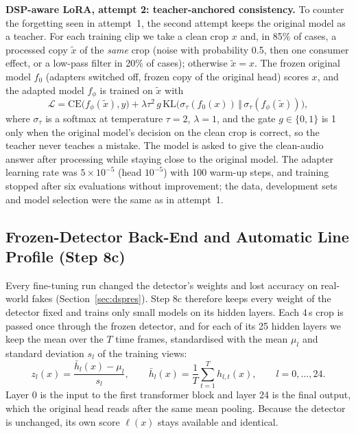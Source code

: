 \documentclass[10pt,a4paper,twocolumn]{article}
\newcommand{\llr}{\ell}
\begin{document}
\textbf{DSP-aware LoRA, attempt 2: teacher-anchored consistency.} To counter the forgetting seen in attempt~1, the second attempt keeps the original model as a teacher. For each training clip we take a clean crop $x$ and, in 85\% of cases, a processed copy $\tilde x$ of the \emph{same} crop (noise with probability 0.5, then one consumer effect, or a low-pass filter in 20\% of cases); otherwise $\tilde x=x$. The frozen original model $f_0$ (adapters switched off, frozen copy of the original head) scores $x$, and the adapted model $f_\phi$ is trained on $\tilde x$ with
\begin{equation}
\mathcal{L}=\mathrm{CE}\big(f_\phi(\tilde x),y\big)+\lambda\tau^{2}\,g\,\mathrm{KL}\big(\sigma_\tau(f_0(x))\,\Vert\,\sigma_\tau(f_\phi(\tilde x))\big),
\label{eq:consistency}
\end{equation}
where $\sigma_\tau$ is a softmax at temperature $\tau=2$, $\lambda=1$, and the gate $g\in\{0,1\}$ is 1 only when the original model's decision on the clean crop is correct, so the teacher never teaches a mistake. The model is asked to give the clean-audio answer after processing while staying close to the original model. The adapter learning rate was $5\times10^{-5}$ (head $10^{-5}$) with 100 warm-up steps, and training stopped after six evaluations without improvement; the data, development sets and model selection were the same as in attempt~1.

\subsection{Frozen-Detector Back-End and Automatic Line Profile (Step 8c)}
\label{sec:backend}
Every fine-tuning run changed the detector's weights and lost accuracy on real-world fakes (Section~\ref{sec:dspres}). Step 8c therefore keeps every weight of the detector fixed and trains only small models on its hidden layers. Each 4\,s crop is passed once through the frozen detector, and for each of its 25 hidden layers we keep the mean over the $T$ time frames, standardised with the mean $\mu_l$ and standard deviation $s_l$ of the training views:
\begin{equation}
z_l(x)=\frac{\bar h_l(x)-\mu_l}{s_l},\qquad \bar h_l(x)=\frac{1}{T}\sum_{t=1}^{T}h_{l,t}(x),\qquad l=0,\dots,24 .
\label{eq:layers}
\end{equation}
Layer 0 is the input to the first transformer block and layer 24 is the final output, which the original head reads after the same mean pooling. Because the detector is unchanged, its own score $\llr(x)$ stays available and identical.
\end{document}
